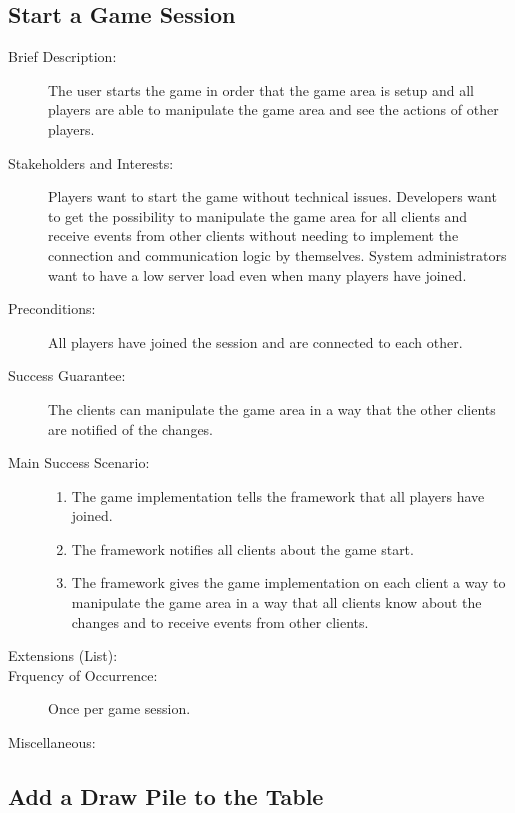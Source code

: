 \subsection{Start a Game Session}

\begin{description}
  \item[Brief Description:] The user starts the game in order that the game
  area is setup and all players are able to manipulate the game area and see
  the actions of other players.
  \item[Stakeholders and Interests:] Players want to start the game without
  technical issues. Developers want to get the possibility to manipulate the
  game area for all clients and receive events from other clients without
  needing to implement the connection and communication logic by themselves.
  System administrators want to have a low server load even when many players
  have joined.
  \item[Preconditions:] All players have joined the session and are connected
  to each other.
  \item[Success Guarantee:] The clients can manipulate the game area in a way
  that the other clients are notified of the changes.
  \item[Main Success Scenario:] \hfill
  \begin{enumerate}
    \item The game implementation tells the framework that all players have
    joined.
    \item The framework notifies all clients about the game start.
    \item The framework gives the game implementation on each client a way to
    manipulate the game area in a way that all clients know about the changes
    and to receive events from other clients.
  \end{enumerate}
  \item[Extensions (List):] \hfill
  \item[Frquency of Occurrence:] Once per game session.
  \item[Miscellaneous:] \hfill
\end{description}

\subsection{Add a Draw Pile to the Table}

